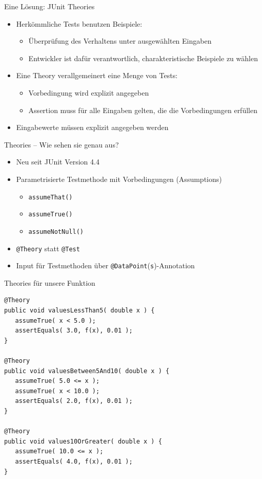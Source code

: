 \begin{frame}{Eine Lösung: JUnit Theories}
	\begin{itemize}
		\item Herkömmliche Tests benutzen Beispiele:
			\begin{itemize}
				\item Überprüfung des Verhaltens unter ausgewählten Eingaben
				\item Entwickler ist dafür verantwortlich, charakteristische Beispiele zu wählen
			\end{itemize}
		\item Eine Theory verallgemeinert eine Menge von Tests:
			\begin{itemize}
				\item Vorbedingung wird explizit angegeben
				\item Assertion muss für alle Eingaben gelten, die die Vorbedingungen erfüllen
			\end{itemize}
		\item Eingabewerte müssen explizit angegeben werden
	\end{itemize}
\end{frame}


\begin{frame}{Theories -- Wie sehen sie genau aus?}
	\begin{itemize}
		\item Neu seit JUnit Version 4.4
		\item Parametrisierte Testmethode mit Vorbedingungen (Assumptions)
			\begin{itemize}
				\item \texttt{assumeThat()}
				\item \texttt{assumeTrue()}
				\item \texttt{assumeNotNull()}
			\end{itemize}
		\item \texttt{@Theory} statt \texttt{@Test}
		\item Input für Testmethoden über \texttt{@DataPoint}(\texttt{s})-Annotation
	\end{itemize}
\end{frame}


\begin{frame}[fragile]{Theories für unsere Funktion}
\begin{lstlisting}
@Theory
public void valuesLessThan5( double x ) {
   assumeTrue( x < 5.0 );
   assertEquals( 3.0, f(x), 0.01 );
}

@Theory
public void valuesBetween5And10( double x ) {
   assumeTrue( 5.0 <= x ); 
   assumeTrue( x < 10.0 );
   assertEquals( 2.0, f(x), 0.01 );
}

@Theory
public void values10OrGreater( double x ) {
   assumeTrue( 10.0 <= x );
   assertEquals( 4.0, f(x), 0.01 );
}
\end{lstlisting}
\end{frame}

